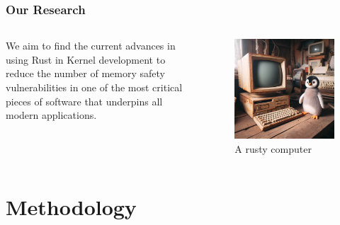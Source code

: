 \documentclass{beamer}
\begin{document}
\begin{frame}
  \frametitle{Our Research}
  \begin{columns}
    \begin{column}{0.5\textwidth}
      We aim to find the current advances in using Rust in Kernel development to reduce the number of
      memory safety vulnerabilities in one of the most critical pieces of software that underpins all
      modern applications.
    \end{column}
    \begin{column}{0.5\textwidth}
      \begin{figure}
        \caption{A rusty computer\footnotemark[1]}
        \includegraphics[width=.8\textwidth]{images/rusty.jpeg}\footnotemark[1]
      \end{figure}
    \end{column}
  \end{columns}
  \href{https://github.com/shanep/esem-2024/blob/master/proofs/esem24-50.pdf}{}
\end{frame}

\section{Methodology}
\end{document}
